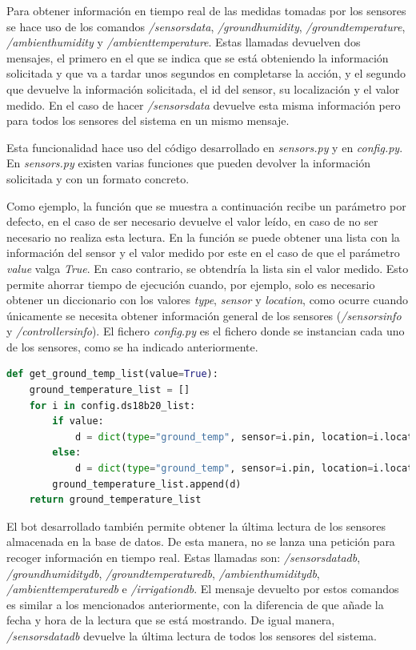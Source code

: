 \documentclass[a4paper, 12pt, oneside]{book}
\begin{document}
Para obtener información en tiempo real de las medidas tomadas por los sensores se hace uso de los comandos \textit{/sensorsdata}, \textit{/groundhumidity}, \textit{/groundtemperature}, \textit{/ambienthumidity} y \textit{/ambienttemperature}. Estas llamadas devuelven dos mensajes, el primero en el que se indica que se está obteniendo la información solicitada y que va a tardar unos segundos en completarse la acción, y el segundo que devuelve la información solicitada, el id del sensor, su localización y el valor medido. En el caso de hacer \textit{/sensorsdata} devuelve esta misma información pero para todos los sensores del sistema en un mismo mensaje.

Esta funcionalidad hace uso del código desarrollado en \textit{sensors.py} y en \textit{config.py}. En \textit{sensors.py} existen varias funciones que pueden devolver la información solicitada y con un formato concreto. 

Como ejemplo, la función que se muestra a continuación recibe un parámetro por defecto, en el caso de ser necesario devuelve el valor leído, en caso de no ser necesario no realiza esta lectura.
En la función se puede obtener una lista con la información del sensor y el valor medido por este en el caso de que el parámetro \textit{value} valga \textit{True}. En caso contrario, se obtendría la lista sin el valor medido. 
Esto permite ahorrar tiempo de ejecución cuando, por ejemplo, solo es necesario obtener un diccionario con los valores \textit{type}, \textit{sensor} y \textit{location}, como ocurre cuando únicamente se necesita obtener información general de los sensores (\textit{/sensorsinfo} y \textit{/controllersinfo}).
El fichero \textit{config.py} es el fichero donde se instancian cada uno de los sensores, como se ha indicado anteriormente.

\begin{lstlisting}[language=Python]
def get_ground_temp_list(value=True):
    ground_temperature_list = []
    for i in config.ds18b20_list:
        if value:
            d = dict(type="ground_temp", sensor=i.pin, location=i.location, 		value=read_ground_temperature(i.pin))
        else:
            d = dict(type="ground_temp", sensor=i.pin, location=i.location)
        ground_temperature_list.append(d)
    return ground_temperature_list
\end{lstlisting}

El bot desarrollado también permite obtener la última lectura de los sensores almacenada en la base de datos. De esta manera, no se lanza una petición para recoger información en tiempo real. Estas llamadas son: \textit{/sensorsdatadb}, \textit{/groundhumiditydb}, \textit{/groundtemperaturedb}, \textit{/ambienthumiditydb}, \textit{/ambienttemperaturedb} e \textit{/irrigationdb}. El mensaje devuelto por estos comandos es similar a los mencionados anteriormente, con la diferencia de que añade la fecha y hora de la lectura que se está mostrando. De igual manera, \textit{/sensorsdatadb} devuelve la última lectura de todos los sensores del sistema.
\end{document}
